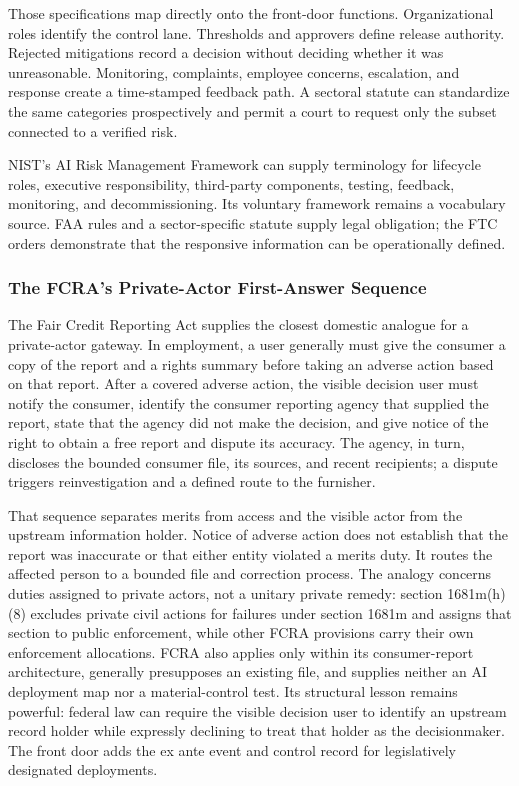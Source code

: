 Those specifications map directly onto the front-door functions. Organizational roles identify the control lane. Thresholds and approvers define release authority. Rejected mitigations record a decision without deciding whether it was unreasonable. Monitoring, complaints, employee concerns, escalation, and response create a time-stamped feedback path. A sectoral statute can standardize the same categories prospectively and permit a court to request only the subset connected to a verified risk.

NIST's AI Risk Management Framework can supply terminology for lifecycle roles, executive responsibility, third-party components, testing, feedback, monitoring, and decommissioning. Its voluntary framework remains a vocabulary source. FAA rules and a sector-specific statute supply legal obligation; the FTC orders demonstrate that the responsive information can be operationally defined.

\subsubsection{The FCRA's Private-Actor First-Answer Sequence}

The Fair Credit Reporting Act supplies the closest domestic analogue for a private-actor gateway. In employment, a user generally must give the consumer a copy of the report and a rights summary before taking an adverse action based on that report. After a covered adverse action, the visible decision user must notify the consumer, identify the consumer reporting agency that supplied the report, state that the agency did not make the decision, and give notice of the right to obtain a free report and dispute its accuracy. The agency, in turn, discloses the bounded consumer file, its sources, and recent recipients; a dispute triggers reinvestigation and a defined route to the furnisher.

That sequence separates merits from access and the visible actor from the upstream information holder. Notice of adverse action does not establish that the report was inaccurate or that either entity violated a merits duty. It routes the affected person to a bounded file and correction process. The analogy concerns duties assigned to private actors, not a unitary private remedy: section 1681m(h)(8) excludes private civil actions for failures under section 1681m and assigns that section to public enforcement, while other FCRA provisions carry their own enforcement allocations. FCRA also applies only within its consumer-report architecture, generally presupposes an existing file, and supplies neither an AI deployment map nor a material-control test. Its structural lesson remains powerful: federal law can require the visible decision user to identify an upstream record holder while expressly declining to treat that holder as the decisionmaker. The front door adds the ex ante event and control record for legislatively designated deployments.


